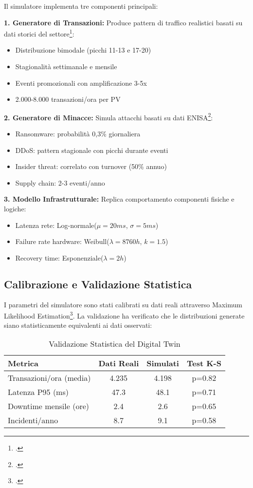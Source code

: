 Il simulatore implementa tre componenti principali:

\textbf{1. Generatore di Transazioni:} Produce pattern di traffico realistici basati su dati storici del settore\footcite{federdistribuzione2024}:
\begin{itemize}
\item Distribuzione bimodale (picchi 11-13 e 17-20)
\item Stagionalità settimanale e mensile
\item Eventi promozionali con amplificazione 3-5x
\item 2.000-8.000 transazioni/ora per PV
\end{itemize}

\textbf{2. Generatore di Minacce:} Simula attacchi basati su dati ENISA\footcite{enisa2024retail}:
\begin{itemize}
\item Ransomware: probabilità 0,3\% giornaliera
\item DDoS: pattern stagionale con picchi durante eventi
\item Insider threat: correlato con turnover (50\% annuo)
\item Supply chain: 2-3 eventi/anno
\end{itemize}

\textbf{3. Modello Infrastrutturale:} Replica comportamento componenti fisiche e logiche:
\begin{itemize}
\item Latenza rete: Log-normale($\mu=20ms$, $\sigma=5ms$)
\item Failure rate hardware: Weibull($\lambda=8760h$, $k=1.5$)
\item Recovery time: Esponenziale($\lambda=2h$)
\end{itemize}

\subsection{Calibrazione e Validazione Statistica}
\label{subsec:calibrazione}

I parametri del simulatore sono stati calibrati su dati reali attraverso Maximum Likelihood Estimation\footcite{damodaran2024}. La validazione ha verificato che le distribuzioni generate siano statisticamente equivalenti ai dati osservati:

\begin{table}[htbp]
\centering
\caption{Validazione Statistica del Digital Twin}
\label{tab:validazione_twin}
\begin{tabular}{lccc}
\toprule
\textbf{Metrica} & \textbf{Dati Reali} & \textbf{Simulati} & \textbf{Test K-S} \\
\midrule
Transazioni/ora (media) & 4.235 & 4.198 & p=0.82 \\
Latenza P95 (ms) & 47.3 & 48.1 & p=0.71 \\
Downtime mensile (ore) & 2.4 & 2.6 & p=0.65 \\
Incidenti/anno & 8.7 & 9.1 & p=0.58 \\
\bottomrule
\end{tabular}
\end{table}

